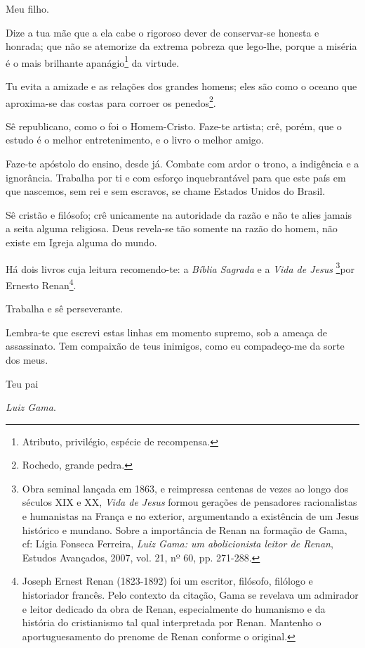 Meu filho.

Dize a tua mãe que a ela cabe o rigoroso dever de conservar-se honesta e
honrada; que não se atemorize da extrema pobreza que lego-lhe, porque a
miséria é o mais brilhante apanágio\footnote{Atributo, privilégio,
  espécie de recompensa.} da virtude.

Tu evita a amizade e as relações dos grandes homens; eles são como o
oceano que aproxima-se das costas para corroer os penedos\footnote{
  Rochedo, grande pedra.}.

Sê republicano, como o foi o Homem-Cristo. Faze-te artista; crê, porém,
que o estudo é o melhor entretenimento, e o livro o melhor amigo.

Faze-te apóstolo do ensino, desde já. Combate com ardor o trono, a
indigência e a ignorância. Trabalha por ti e com esforço inquebrantável
para que este país em que nascemos, sem rei e sem escravos, se chame
Estados Unidos do Brasil.

Sê cristão e filósofo; crê unicamente na autoridade da razão e não te
alies jamais a seita alguma religiosa. Deus revela-se tão somente na
razão do homem, não existe em Igreja alguma do mundo.

Há dois livros cuja leitura recomendo-te: a \emph{Bíblia Sagrada} e a
\emph{Vida de Jesus} \footnote{Obra seminal lançada em 1863, e
  reimpressa centenas de vezes ao longo dos séculos XIX e XX, \emph{Vida
  de Jesus} formou gerações de pensadores racionalistas e humanistas na
  França e no exterior, argumentando a existência de um Jesus histórico
  e mundano. Sobre a importância de Renan na formação de Gama, cf: Lígia
  Fonseca Ferreira, \emph{Luiz Gama: um abolicionista leitor de Renan},
  Estudos Avançados, 2007, vol. 21, nº 60, pp. 271-288.}por Ernesto
Renan\footnote{Joseph Ernest Renan (1823-1892) foi um escritor,
  filósofo, filólogo e historiador francês. Pelo contexto da citação,
  Gama se revelava um admirador e leitor dedicado da obra de Renan,
  especialmente do humanismo e da história do cristianismo tal qual
  interpretada por Renan. Mantenho o aportuguesamento do prenome de
  Renan conforme o original.}.

Trabalha e sê perseverante.

Lembra-te que escrevi estas linhas em momento supremo, sob a ameaça de
assassinato. Tem compaixão de teus inimigos, como eu compadeço-me da
sorte dos meus.

Teu pai

\emph{Luiz Gama}.

\pagebreak
\mbox{}\vfill
\thispagestyle{empty}

